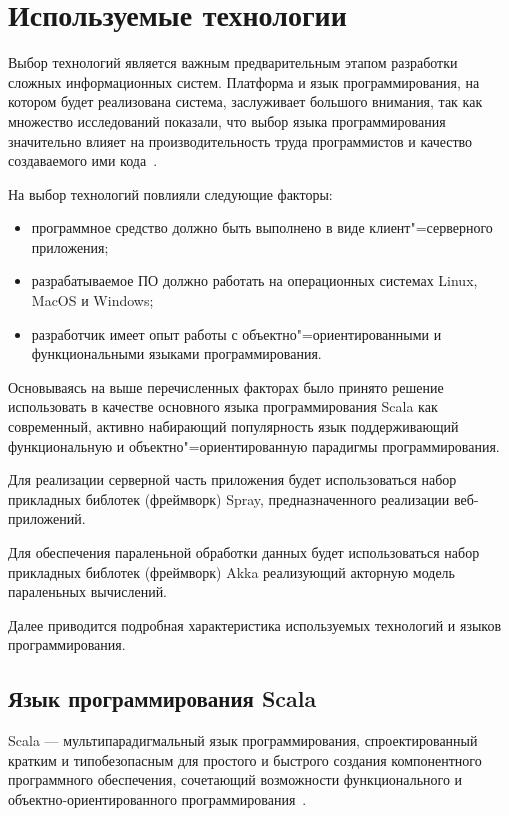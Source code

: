 \section{Используемые технологии}
\label{sec:techs:intro}

Выбор технологий является важным предварительным этапом разработки сложных информационных систем. Платформа и язык программирования, на котором будет реализована система, заслуживает большого внимания, так как множество исследований показали, что выбор языка программирования значительно влияет на производительность труда программистов и качество создаваемого ими кода~\cite[c.~59]{mcconnell_2005}.

На выбор технологий повлияли следующие факторы:
\begin{itemize}
\item программное средство должно быть выполнено в виде клиент"=серверного приложения;
\item разрабатываемое ПО должно работать на операционных системах Linux, MacOS и Windows;
\item разработчик имеет опыт работы с объектно"=ориентированными и функциональными языками программирования.
\end{itemize}

Основываясь на выше перечисленных факторах было принято решение использовать в качестве основного языка программирования Scala как современный, активно набирающий популярность язык поддерживающий функциональную и объектно"=ориентированную парадигмы программирования.

Для реализации серверной часть приложения будет использоваться набор прикладных библотек (фреймворк) Spray, предназначенного реализации веб-приложений.

Для обеспечения параленьной обработки данных будет использоваться набор прикладных библотек (фреймворк) Akka реализующий акторную модель параленьных вычислений. 

Далее приводится подробная характеристика используемых технологий и языков программирования.


\subsection{Язык программирования Scala}
\label{sub:techs:scala}
Scala — мультипарадигмальный язык программирования, спроектированный кратким и типобезопасным для простого и быстрого создания компонентного программного обеспечения, сочетающий возможности функционального и объектно-ориентированного программирования~\cite{wiki_scala}.

